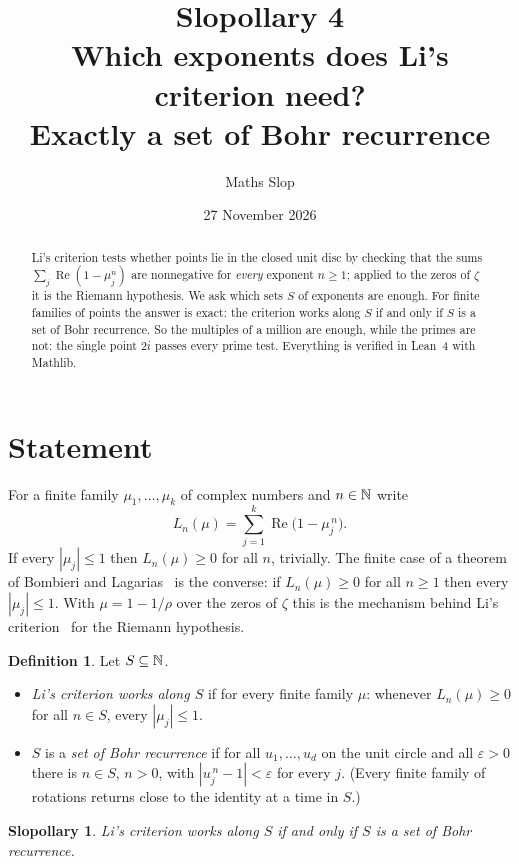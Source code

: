 \documentclass[11pt,a4paper]{article}
\title{\textbf{Slopollary 4}\\[2pt]\large Which exponents does Li's criterion need?\\ Exactly a set of Bohr recurrence}
\author{Maths Slop}
\date{27 November 2026}
\newtheorem{theorem}{Slopollary}
\theoremstyle{definition}\newtheorem*{definition}{Definition}
\theoremstyle{remark}\newtheorem*{remark}{Remark}
\newcommand{\re}{\operatorname{Re}}
\begin{document}
\maketitle

\begin{abstract}\noindent
Li's criterion tests whether points lie in the closed unit disc by checking that the sums
$\sum_j \re(1-\mu_j^n)$ are nonnegative for \emph{every} exponent $n\ge 1$; applied to the zeros of
$\zeta$ it is the Riemann hypothesis. We ask which sets $S$ of exponents are enough. For finite
families of points the answer is exact: the criterion works along $S$ if and only if $S$ is a set
of Bohr recurrence. So the multiples of a million are enough, while the primes are not: the single
point $2i$ passes every prime test. Everything is verified in Lean~4 with Mathlib.
\end{abstract}

\section{Statement}

For a finite family $\mu_1,\dots,\mu_k$ of complex numbers and $n\in\mathbb{N}$ write
\[ L_n(\mu)=\sum_{j=1}^{k}\re\bigl(1-\mu_j^{\,n}\bigr). \]
If every $|\mu_j|\le 1$ then $L_n(\mu)\ge 0$ for all $n$, trivially. The finite case of a theorem
of Bombieri and Lagarias~\cite{BL} is the converse: if $L_n(\mu)\ge 0$ for all $n\ge 1$ then every
$|\mu_j|\le1$. With $\mu=1-1/\rho$ over the zeros of $\zeta$ this is the mechanism behind Li's
criterion~\cite{Li} for the Riemann hypothesis.

\begin{definition}
Let $S\subseteq\mathbb{N}$.
\begin{itemize}[leftmargin=1.4em,itemsep=2pt]
\item \emph{Li's criterion works along $S$} if for every finite family $\mu$: whenever
$L_n(\mu)\ge0$ for all $n\in S$, every $|\mu_j|\le 1$.
\item $S$ is a \emph{set of Bohr recurrence} if for all $u_1,\dots,u_d$ on the unit circle and all
$\varepsilon>0$ there is $n\in S$, $n>0$, with $|u_j^{\,n}-1|<\varepsilon$ for every $j$. (Every
finite family of rotations returns close to the identity at a time in $S$.)
\end{itemize}
\end{definition}

\begin{theorem}
Li's criterion works along $S$ if and only if $S$ is a set of Bohr recurrence.
\end{theorem}
\end{document}
